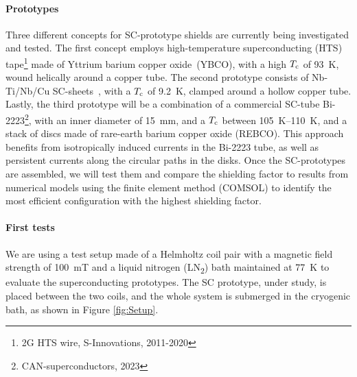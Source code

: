 \begin{refsection}
        \paragraph{Prototypes}
        Three different concepts for SC-prototype shields are currently being investigated and tested. 
        The first concept employs high-temperature superconducting (HTS) tape\footnote{2G HTS wire, S-Innovations, 2011-2020} made of Yttrium barium copper oxide~(YBCO), with a high $T_{\rm c}$ of \SI{93}{K}, wound helically around a copper tube. The second prototype consists of Nb-Ti/Nb/Cu SC-sheets~\cite{Barna2018}, with a $T_{\rm c}$ of \SI{9.2}{K}, clamped around a hollow copper tube. 
        Lastly, the third prototype will be a combination of a commercial SC-tube Bi-2223\footnote{CAN-superconductors, 2023}, with an inner diameter of \SI{15}{mm}, and a $T_{\rm c}$ between \SIrange{105}{110}{K}, and a stack of discs made of rare-earth barium copper oxide (REBCO)\@. 
        This approach benefits from isotropically induced currents in the Bi-2223 tube, as well as persistent currents along the circular paths in the disks.
        Once the SC-prototypes are assembled, we will test them and compare the shielding factor to results from numerical models using the finite element method (COMSOL) to identify the most efficient configuration with the highest shielding factor. 

        \paragraph{First tests}
        We are using a test setup made of a Helmholtz coil pair with a magnetic field strength of \SI{100}{mT} and a liquid nitrogen (LN\textsubscript{2}) bath maintained at \SI{77}{K} to evaluate the superconducting prototypes. 
        The SC prototype, under study, is placed between the two coils, and the whole system is submerged in the cryogenic bath, as shown in Figure \ref{fig:Setup}.


\end{refsection}
